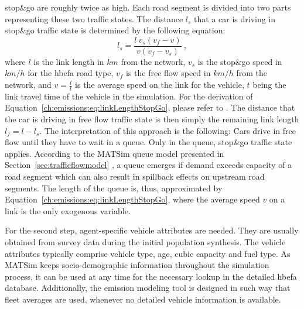 {{stop\&go are roughly twice as high.
%
}
%
Each road segment is divided into two parts representing these two 
traffic states. The distance $l_s$ that a car is driving in stop\&go traffic 
state is determined by the following equation:
%
\begin{equation}
l_s = \frac{l \ v_s  (v_f-v)}{v (v_f - v_s)} \ ,
\label{ch:emissions:eq:linkLengthStopGo}
\end{equation}
%
where $l$ is the link length in $km$ from the network, $v_s$ is the stop\&go speed in $km/h$ for the \gls{hbefa} road type, $v_f$ is the free flow speed in $km/h$ from the network, and $v=\frac{l}{t}$ is the average speed on the link for the vehicle, $t$ being the link travel time of the vehicle in the simulation. For the derivation of Equation~\ref{ch:emissions:eq:linkLengthStopGo}, please refer to \citet{Kickhoefer_PhDThesis_2014}. The distance that the car is driving in free flow traffic state is then simply the remaining link length $l_f = l - l_s$.
%
The interpretation of this approach is the following:
%
Cars drive in free flow until they have to wait in a queue. Only in the queue, stop\&go traffic state applies. According to the MATSim queue model presented in Section~\ref{sec:trafficflowmodel}
%
%
, a queue emerges if demand exceeds capacity of a road segment which can also result in spillback effects on upstream road segments. The length of the queue is, thus, approximated by Equation~\ref{ch:emissions:eq:linkLengthStopGo}, where the average speed $v$ on a link is the only exogenous variable.

For the second step, agent-specific vehicle attributes are needed. They are 
usually obtained from survey data during the initial population 
synthesis. The vehicle attributes typically comprise vehicle type, age, cubic 
capacity 
and fuel type. As MATSim keeps socio-demographic information throughout 
the 
simulation process, it can be used at any time for the necessary lookup in the 
detailed \gls{hbefa} database. Additionally, the emission modeling tool 
is designed in such way that fleet averages are used, whenever no detailed 
vehicle information is available.

}
